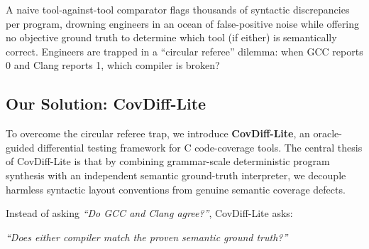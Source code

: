 \documentclass[sigconf,review,anonymous=false]{acmart}
\theoremstyle{definition}
\begin{document}
A naive tool-against-tool comparator flags thousands of syntactic discrepancies per program, drowning engineers in an ocean of false-positive noise while offering no objective ground truth to determine which tool (if either) is semantically correct. Engineers are trapped in a ``circular referee'' dilemma: when GCC reports 0 and Clang reports 1, which compiler is broken?

\subsection{Our Solution: CovDiff-Lite}
To overcome the circular referee trap, we introduce \textbf{CovDiff-Lite}, an oracle-guided differential testing framework for C code-coverage tools. The central thesis of CovDiff-Lite is that by combining grammar-scale deterministic program synthesis with an independent semantic ground-truth interpreter, we decouple harmless syntactic layout conventions from genuine semantic coverage defects.

Instead of asking \textit{``Do GCC and Clang agree?''}, CovDiff-Lite asks:
\begin{center}
\textit{``Does either compiler match the proven semantic ground truth?''}
\end{center}
\end{document}
